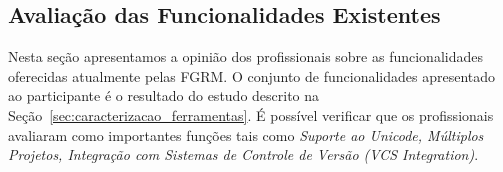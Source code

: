 \subsection{Avaliação das Funcionalidades Existentes}
\label{sub:avaliação_das_funcionalidades_existentes}

Nesta seção apresentamos a opinião dos profissionais sobre as funcionalidades
oferecidas atualmente pelas FGRM\@. O conjunto de funcionalidades apresentado ao
participante é o resultado do estudo descrito na
Seção~\ref{sec:caracterizacao_ferramentas}. É possível verificar que os
profissionais avaliaram como importantes funções tais como \textit{Suporte ao
    Unicode, Múltiplos Projetos, Integração com Sistemas de Controle de Versão
    (VCS Integration)}.

